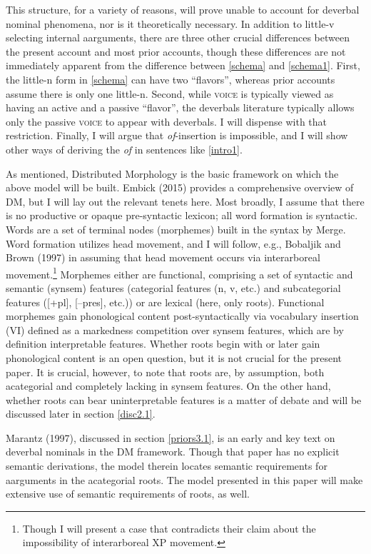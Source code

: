 \documentclass[12pt]{article}
\begin{document}
This structure, for a variety of reasons, will prove unable to account for deverbal nominal phenomena, nor is it theoretically necessary. In addition to little-v selecting internal aarguments, there are three other crucial differences between the present account and most prior accounts, though these differences are not immediately apparent from the difference between \ref{schema} and \ref{schema1}. First, the little-n form in \ref{schema} can have two ``flavors'', whereas prior accounts assume there is only one little-n. Second, while \textsc{voice} is typically viewed as having an active and a passive ``flavor'', the deverbals literature typically allows only the passive \textsc{voice} to appear with deverbals. I will dispense with that restriction. Finally, I will argue that \textit{of}-insertion is impossible, and I will show other ways of deriving the \textit{of} in sentences like \ref{intro1}.

As mentioned, Distributed Morphology is the basic framework on which the above model will be built. Embick (2015) provides a comprehensive overview of DM, but I will lay out the relevant tenets here. Most broadly, I assume that there is no productive or opaque pre-syntactic lexicon; all word formation is syntactic. Words are a set of terminal nodes (morphemes) built in the syntax by Merge. Word formation utilizes head movement, and I will follow, e.g., Bobaljik and Brown (1997) in assuming that head movement occurs via interarboreal movement.\footnote{ Though I will present a case that contradicts their claim about the impossibility of interarboreal XP movement.} Morphemes either are functional, comprising a set of syntactic and semantic (synsem) features (categorial features (n, v, etc.) and subcategorial features ([+pl], [--pres], etc.)) or are lexical (here, only roots). Functional morphemes gain phonological content post-syntactically via vocabulary insertion (VI) defined as a markedness competition over synsem features, which are by definition interpretable features. Whether roots begin with or later gain phonological content is an open question, but it is not crucial for the present paper. It is crucial, however, to note that roots are, by assumption, both acategorial and completely lacking in synsem features. On the other hand, whether roots can bear uninterpretable features is a matter of debate and will be discussed later in section \ref{disc2.1}.

Marantz (1997), discussed in section \ref{priors3.1}, is an early and key text on deverbal nominals in the DM framework. Though that paper has no explicit semantic derivations, the model therein locates semantic requirements for aarguments in the acategorial roots. The model presented in this paper will make extensive use of semantic requirements of roots, as well.
\end{document}
